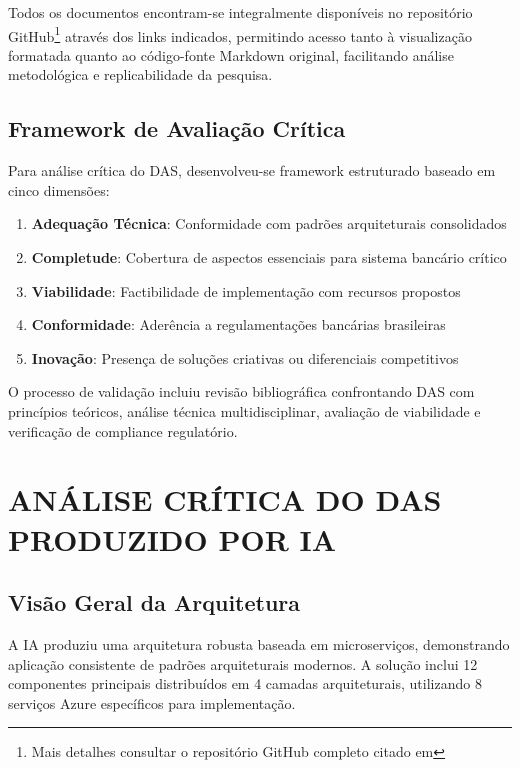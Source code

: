 Todos os documentos encontram-se integralmente disponíveis no repositório GitHub\footnote{Mais detalhes consultar o repositório GitHub completo citado em } através dos links indicados, permitindo acesso tanto à visualização formatada quanto ao código-fonte Markdown original, facilitando análise metodológica e replicabilidade da pesquisa.

\section{Framework de Avaliação Crítica}

Para análise crítica do DAS, desenvolveu-se framework estruturado baseado em cinco dimensões:

\begin{enumerate}[]
	\item \textbf{Adequação Técnica}: Conformidade com padrões arquiteturais consolidados 
	\item \textbf{Completude}: Cobertura de aspectos essenciais para sistema bancário crítico 
	\item \textbf{Viabilidade}: Factibilidade de implementação com recursos propostos 
	\item \textbf{Conformidade}: Aderência a regulamentações bancárias brasileiras 
	\item \textbf{Inovação}: Presença de soluções criativas ou diferenciais competitivos
\end{enumerate}

O processo de validação incluiu revisão bibliográfica confrontando DAS com princípios teóricos, análise técnica multidisciplinar, avaliação de viabilidade e verificação de compliance regulatório.

\chapter{ANÁLISE CRÍTICA DO DAS PRODUZIDO POR IA}

\section{Visão Geral da Arquitetura}

A IA produziu uma arquitetura robusta baseada em microserviços, demonstrando aplicação consistente de padrões arquiteturais modernos. A solução inclui 12 componentes principais distribuídos em 4 camadas arquiteturais, utilizando 8 serviços Azure específicos para implementação.

